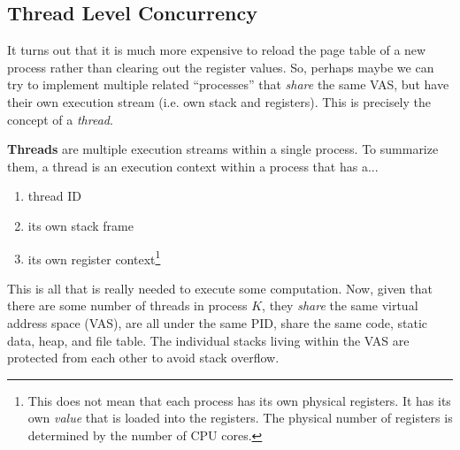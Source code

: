 \documentclass{article}
\newcounter{definition}[section]
\newcounter{code}[section]
\begin{document}
  \subsection{Thread Level Concurrency}

    It turns out that it is much more expensive to reload the page table of a new process rather than clearing out the register values. So, perhaps maybe we can try to implement multiple related ``processes'' that \textit{share} the same VAS, but have their own execution stream (i.e. own stack and registers). This is precisely the concept of a \textit{thread}. 

    \begin{definition}[Threads]
      \label{def:threads}
      \textbf{Threads} are multiple execution streams within a single process. To summarize them, a thread is an execution context within a process that has a... 
      \begin{enumerate}
        \item thread ID 
        \item its own stack frame 
        \item its own register context\footnote{This does not mean that each process has its own physical registers. It has its own \textit{value} that is loaded into the registers. The physical number of registers is determined by the number of CPU cores. }
      \end{enumerate}
      This is all that is really needed to execute some computation. Now, given that there are some number of threads in process $K$, they \textit{share} the same virtual address space (VAS), are all under the same PID, share the same code, static data, heap, and file table. The individual stacks living within the VAS are protected from each other to avoid stack overflow. 


\end{definition}
\end{document}
